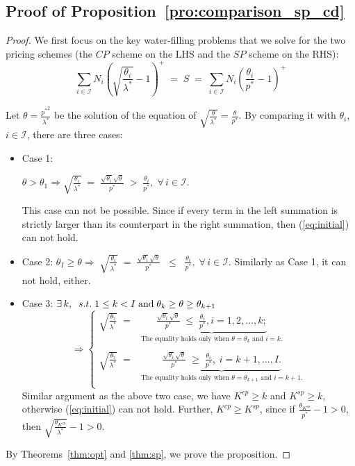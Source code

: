 \documentclass[twocolumn,10pt,twosided]{IEEEtran}
\begin{document}
\subsection{Proof of Proposition~\ref{pro:comparison_sp_cd}}
\label{appendix_cp_sp}
\begin{proof}
We first focus on the key water-filling problems that we solve for the two
pricing schemes (the $CP$ scheme on the LHS and the $SP$ scheme on the RHS):
\begin{equation}
\label{eq:initial}
\sum_{i\in \mathcal{I}} N_i\left(\sqrt{\frac{\theta_i}{\lambda^*}}-1\right)^+\;=\;S\;=\;
\sum_{i\in \mathcal{I}} N_i\left({\frac{\theta_i}{p^*}}-1\right)^+\end{equation}

Let $\theta=\frac{{p^*}^2}{\lambda^*}$ be the solution of the equation of
$\sqrt{\frac{\theta}{\lambda^*}}=\frac{\theta}{p^*}$. By comparing it with $\theta_i$,
$i\in \mathcal{I}$, there are three cases:
\begin{itemize}
    \item Case 1:

$\theta> \theta_1\Rightarrow \sqrt{\frac{\theta_i}{\lambda^*}}\; = \; \frac{\sqrt{\theta_i}\sqrt{\theta}}{p^*}\; > \;\frac{\theta_i}{p^*},\; \forall\, i\in\mathcal{I}.$

 This case can not be possible. Since if every term in the left summation
 is strictly larger than its counterpart in the right
summation, then (\ref{eq:initial}) can not hold.

\item Case 2:
$\theta_I\ge \theta\Rightarrow\;\sqrt{\frac{\theta_i}{\lambda^*}}\; =
\;\frac{\sqrt{\theta_i}\sqrt{\theta}}{p^*}\;\; \le\; \;\frac{\theta_i}{p^*},\; \forall\, i\in\mathcal{I}.$
Similarly as Case 1, it can not hold, either.

\item Case 3:
$\exists\,k,  \;\; s.t.\;1\le k<I\;{\rm{and}}\;\theta_k\ge\theta\ge\theta_{k+1}$
$$\Rightarrow\left\{{\begin{array}{ll}
\sqrt{\frac{\theta_i}{\lambda^*}}\;=&\underbrace{ \frac{\sqrt{\theta_i}\sqrt{\theta}}{p^*}\; \le \;\frac{\theta_i}{p^*}, i=1,2,\dots,k;}_\text{The equality holds only when $\theta=\theta_k$ and $i=k$.} \\
\\
\sqrt{\frac{\theta_i}{\lambda^*}} \;=&\underbrace{\frac{\sqrt{\theta_i}\sqrt{\theta}}{p^*}\; \ge \;\frac{\theta_i}{p^*},\;  i=k+1,\dots,I.}_\text{The equality holds only when $\theta=\theta_{k+1}$ and $i=k+1$.} \\
\end{array}} \right.$$
Similar argument as the above two case,  we have $K^{cp}\ge k$ and $K^{sp}\ge k$, otherwise
(\ref{eq:initial}) can not hold. Further, $K^{cp}\ge
K^{sp}$, since if $\frac{\theta_{K^{sp}}}{p^*}-1>0$, then
$\sqrt{\frac{\theta_{K^{cp}}}{\lambda^*}}-1>0$.
\end{itemize}
By Theorems~\ref{thm:opt} and \ref{thm:sp}, we prove the proposition.
\end{proof}
\end{document}
